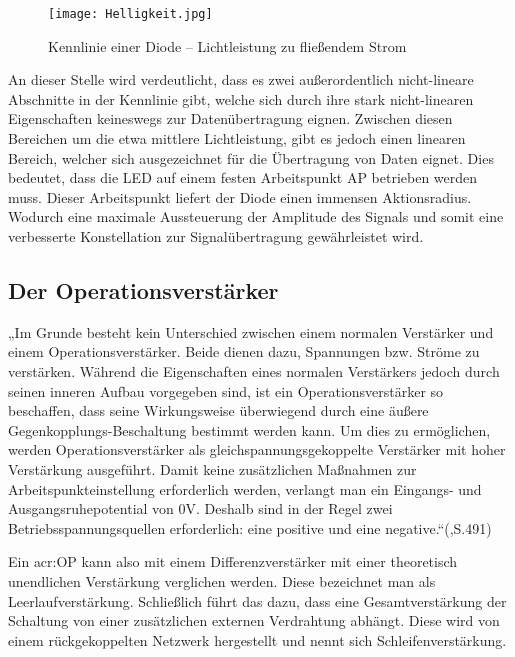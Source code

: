 \begin{figure}[H]
	\centering
	\texttt{[image: Helligkeit.jpg]}
	\caption[Kennlinie einer Diode – Lichtleistung zu fließendem Strom]{Kennlinie einer Diode – Lichtleistung zu fließendem Strom} 
	\cite{Eigen}
	\label{fig:Helligkeit}
\end{figure}

An dieser Stelle wird verdeutlicht, dass es zwei außerordentlich nicht-lineare Abschnitte in der Kennlinie gibt, welche sich durch ihre stark nicht-linearen Eigenschaften keineswegs zur Datenübertragung eignen. Zwischen diesen Bereichen um die etwa mittlere Lichtleistung, gibt es jedoch einen linearen Bereich, welcher sich ausgezeichnet für die Übertragung von Daten eignet. Dies bedeutet, dass die LED auf einem festen Arbeitspunkt AP betrieben werden muss. Dieser Arbeitspunkt liefert der Diode einen immensen Aktionsradius. Wodurch eine maximale Aussteuerung der Amplitude des Signals und somit eine verbesserte Konstellation zur Signalübertragung gewährleistet wird.


\subsection{Der Operationsverstärker}
\label{subsec:OP}

„Im Grunde besteht kein Unterschied zwischen einem normalen Verstärker und einem Operationsverstärker. Beide dienen dazu, Spannungen bzw. Ströme zu verstärken. Während die Eigenschaften eines normalen Verstärkers jedoch durch seinen inneren Aufbau vorgegeben sind, ist ein Operationsverstärker so beschaffen, dass seine Wirkungsweise überwiegend durch eine äußere Gegenkopplungs-Beschaltung bestimmt werden kann. Um dies zu ermöglichen, werden Operationsverstärker als gleichspannungsgekoppelte Verstärker mit hoher Verstärkung ausgeführt. Damit keine zusätzlichen Maßnahmen zur Arbeitspunkteinstellung erforderlich werden, verlangt man ein Eingangs- und Ausgangsruhepotential von 0V. Deshalb sind in der Regel zwei Betriebsspannungsquellen erforderlich: eine positive und eine negative.“(\cite{tietzeElectronicCircuits2008},S.491)

Ein \gls{acr:OP} kann also mit einem Differenzverstärker mit einer theoretisch unendlichen Verstärkung verglichen werden. Diese bezeichnet man als Leerlaufverstärkung. Schließlich führt das dazu, dass eine Gesamtverstärkung der Schaltung von einer zusätzlichen externen Verdrahtung abhängt. Diese wird von einem rückgekoppelten Netzwerk hergestellt und nennt sich Schleifenverstärkung.\cite{lutzHalbleiterLeistungsbauelemente2012}

